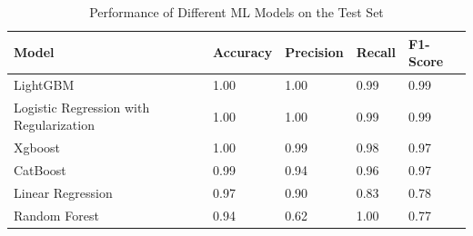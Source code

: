\documentclass[10pt,letterpaper]{article}
\begin{document}
\begin{table}[H]
\centering
\footnotesize
\begin{tabular}{lllll}
\toprule
\textbf{Model} & \textbf{Accuracy} & \textbf{Precision} & \textbf{Recall} &  \textbf{F1-Score}\\
\midrule
LightGBM & 1.00 & 1.00 & 0.99 & 0.99  \\
Logistic Regression with Regularization & 1.00 & 1.00  & 0.99 & 0.99  \\
Xgboost & 1.00 & 0.99 & 0.98 & 0.97  \\
CatBoost & 0.99 & 0.94  & 0.96 & 0.97  \\
Linear Regression & 0.97 & 0.90  & 0.83 & 0.78  \\
Random Forest & 0.94 & 0.62  & 1.00 & 0.77  \\
\bottomrule
\end{tabular}
\caption{Performance of Different ML Models on the Test Set}%
\end{table}
\end{document}
